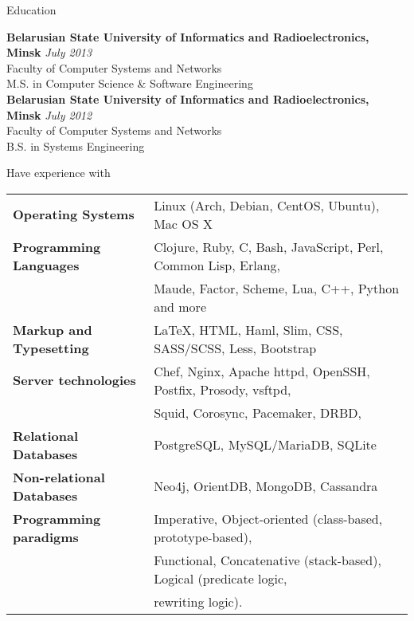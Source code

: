 \documentclass{resume} %
\begin{document}

\begin{rSection}{Education}

{\bf Belarusian State University of Informatics and Radioelectronics, Minsk} \hfill {\em July 2013} \\ 
Faculty of Computer Systems and Networks \\
M.S. in Computer Science \& Software Engineering \smallskip \\
{\bf Belarusian State University of Informatics and Radioelectronics, Minsk} \hfill {\em July 2012} \\ 
Faculty of Computer Systems and Networks \\
B.S. in Systems Engineering \\

\end{rSection}


\begin{rSection}{Have experience with}

\begin{tabular}{ @{} >{\bfseries}l @{\hspace{6ex}} l }
Operating Systems     & Linux (Arch, Debian, CentOS, Ubuntu), Mac OS X \smallskip \\
Programming Languages & Clojure, Ruby, C, Bash, JavaScript, Perl, Common Lisp, Erlang, \\
                      & Maude, Factor, Scheme, Lua, C++, Python and more\smallskip \\
Markup and Typesetting & \LaTeX, HTML, Haml, Slim, CSS, SASS/SCSS, Less, Bootstrap \smallskip \\
Server technologies   & Chef, Nginx, Apache httpd, OpenSSH, Postfix, Prosody, vsftpd,\\
                      & Squid, Corosync, Pacemaker, DRBD, \smallskip \\
Relational Databases & PostgreSQL, MySQL/MariaDB, SQLite \smallskip \\
Non-relational Databases & Neo4j, OrientDB, MongoDB, Cassandra \smallskip \\
Programming paradigms & Imperative, Object-oriented (class-based, prototype-based), \\
                      & Functional, Concatenative (stack-based), Logical (predicate logic, \\
                      & rewriting logic).
\end{tabular}

\end{rSection}
\end{document}

